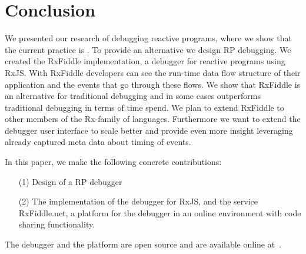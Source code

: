 \section{Conclusion}
We presented our research of debugging reactive programs, where we show that the current practice is \printfdebugging{}. To provide an alternative we design RP debugging. We created the RxFiddle implementation, a debugger for reactive programs using RxJS. With RxFiddle developers can see the run-time data flow structure of their application and the events that go through these flows. We show that RxFiddle is an alternative for traditional debugging and in some cases outperforms traditional debugging in terms of time spend. We plan to extend RxFiddle to other members of the Rx-family of languages. Furthermore we want to extend the debugger user interface to scale better and provide even more insight leveraging already captured meta data about timing of events.

In this paper, we make the following concrete contributions:
\begin{itemize}
\item[(1)] Design of a RP debugger
\item[(2)] The implementation of the debugger for RxJS, and the service RxFiddle.net, a platform for the debugger in an online environment with code sharing functionality.
\end{itemize}

The debugger and the platform are open source and are available online at~\cite{rxfiddle-doi}.
